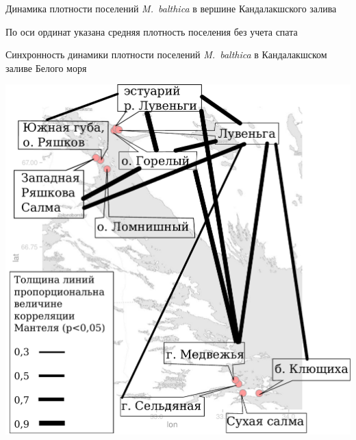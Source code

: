 \documentclass{beamer}
\begin{document}
\begin{frame}{Динамика плотности поселений {\it M.~balthica} в вершине Кандалакшского залива}
\begin{minipage}[t]{.49\linewidth}
\begin{center}
		\end{center}
	\end{minipage}
{\tiny По оси ординат указана средняя плотность поселения без учета спата}
\end{frame}

\begin{frame}{Синхронность динамики плотности поселений {\it M.~balthica} в Кандалакшском заливе Белого моря}
		\begin{center}
			\includegraphics[height=.7\textheight]{mantel_map.pdf}
		\end{center}
\end{frame}
\end{document}
